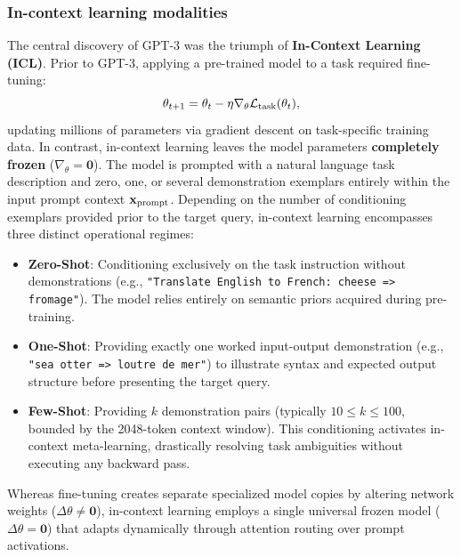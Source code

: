 \documentclass[../../main.tex]{subfiles}
\begin{document}
\subsubsection{In-context learning modalities}
The central discovery of GPT-3 was the triumph of \textbf{In-Context Learning (ICL)}. Prior to GPT-3, applying a pre-trained model to a task required fine-tuning:
\begin{equation}
\label{eq:fine_tuning_update}
\theta_{t+1} = \theta_t - \eta \nabla_\theta \mathcal{L}_{\text{task}}(\theta_t),
\end{equation}
updating millions of parameters via gradient descent on task-specific training data. In contrast, in-context learning leaves the model parameters \textbf{completely frozen} ($\nabla_\theta = \mathbf{0}$). The model is prompted with a natural language task description and zero, one, or several demonstration exemplars entirely within the input prompt context $\mathbf{x}_{\text{prompt}}$. Depending on the number of conditioning exemplars provided prior to the target query, in-context learning encompasses three distinct operational regimes:
\begin{itemize}
    \item \textbf{Zero-Shot}: Conditioning exclusively on the task instruction without demonstrations (e.g., \texttt{"Translate English to French: cheese => fromage"}). The model relies entirely on semantic priors acquired during pre-training.
    \item \textbf{One-Shot}: Providing exactly one worked input-output demonstration (e.g., \texttt{"sea otter => loutre de mer"}) to illustrate syntax and expected output structure before presenting the target query.
    \item \textbf{Few-Shot}: Providing $k$ demonstration pairs (typically $10 \le k \le 100$, bounded by the 2048-token context window). This conditioning activates in-context meta-learning, drastically resolving task ambiguities without executing any backward pass.
\end{itemize}

Whereas fine-tuning creates separate specialized model copies by altering network weights ($\Delta\theta \neq \mathbf{0}$), in-context learning employs a single universal frozen model ($\Delta\theta = \mathbf{0}$) that adapts dynamically through attention routing over prompt activations.
\end{document}
